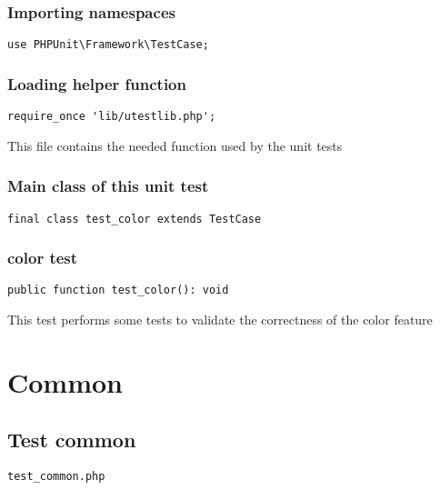 \documentclass[a4paper]{article}
\begin{document}
\hypertarget{toc93}{}
\subsubsection{Importing namespaces}

\begin{lstlisting}
use PHPUnit\Framework\TestCase;
\end{lstlisting}

\hypertarget{toc94}{}
\subsubsection{Loading helper function}

\begin{lstlisting}
require_once 'lib/utestlib.php';
\end{lstlisting}

This file contains the needed function used by the unit tests

\hypertarget{toc95}{}
\subsubsection{Main class of this unit test}

\begin{lstlisting}
final class test_color extends TestCase
\end{lstlisting}

\hypertarget{toc96}{}
\subsubsection{color test}

\begin{lstlisting}
public function test_color(): void
\end{lstlisting}

This test performs some tests to validate the correctness
of the color feature


\hypertarget{toc97}{}
\section{Common}

\hypertarget{toc98}{}
\subsection{Test common}

\begin{lstlisting}
test_common.php
\end{lstlisting}
\end{document}
